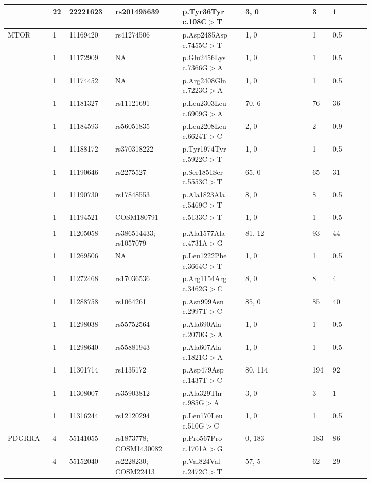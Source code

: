 \begin{longtable}{p{0.1\linewidth}|p{0.02\linewidth}p{0.1\linewidth}p{0.16\linewidth}p{0.15\linewidth}p{0.16\linewidth}p{0.04\linewidth}p{0.09\linewidth}}
		\\
		& 22 & 22221623 & rs201495639 & p.Tyr36Tyr c.108C$>$T & 3, 0 & 3 & 1
		\\
		\hline
		MTOR & 1 & 11169420 & rs41274506 & p.Asp2485Asp c.7455C$>$T & 1, 0 & 1 & 0.5
		\\
		& 1 & 11172909 & NA & p.Glu2456Lys c.7366G$>$A & 1, 0 & 1 & 0.5
		\\
		& 1 & 11174452 & NA & p.Arg2408Gln c.7223G$>$A & 1, 0 & 1 & 0.5
		\\
		& 1 & 11181327 & rs11121691 & p.Leu2303Leu c.6909G$>$A & 70, 6 & 76 & 36
		\\
		& 1 & 11184593 & rs56051835 & p.Leu2208Leu c.6624T$>$C & 2, 0 & 2 & 0.9
		\\
		& 1 & 11188172 & rs370318222 & p.Tyr1974Tyr c.5922C$>$T & 1, 0 & 1 & 0.5
		\\
		& 1 & 11190646 & rs2275527 & p.Ser1851Ser c.5553C$>$T & 65, 0 & 65 & 31
		\\
		& 1 & 11190730 & rs17848553 & p.Ala1823Ala c.5469C$>$T & 8, 0 & 8 & 0.5
		\\
		& 1 & 11194521 & COSM180791 & c.5133C$>$T & 1, 0 & 1 & 0.5
		\\
		\\
		& 1 & 11205058 & rs386514433; rs1057079 & p.Ala1577Ala c.4731A$>$G & 81, 12 & 93 & 44
		\\
		& 1 & 11269506 & NA & p.Leu1222Phe c.3664C$>$T & 1, 0 & 1 & 0.5
		\\
		& 1 & 11272468 & rs17036536 & p.Arg1154Arg c.3462G$>$C & 8, 0 & 8 & 4
		\\
		& 1 & 11288758 & rs1064261 & p.Asn999Asn c.2997T$>$C & 85, 0 & 85 & 40
		\\
		& 1 & 11298038 & rs55752564 & p.Ala690Ala c.2070G$>$A & 1, 0 & 1 & 0.5
		\\
		& 1 & 11298640 & rs55881943 & p.Ala607Ala c.1821G$>$A & 1, 0 & 1 & 0.5
		\\
		& 1 & 11301714 & rs1135172 & p.Asp479Asp c.1437T$>$C & 80, 114 & 194 & 92
		\\
		& 1 & 11308007 & rs35903812 & p.Ala329Thr c.985G$>$A & 3, 0 & 3 & 1
		\\
		& 1 & 11316244 & rs12120294 & p.Leu170Leu c.510G$>$C & 1, 0 & 1 & 0.5
		\\
		\hline
		PDGRRA & 4 & 55141055 & rs1873778; COSM1430082 & p.Pro567Pro c.1701A$>$G & 0, 183 & 183 & 86
		\\
		& 4 & 55152040 & rs2228230; COSM22413 & p.Val824Val c.2472C$>$T & 57, 5 & 62 & 29
		\\

\end{longtable}
